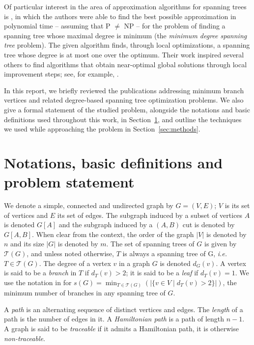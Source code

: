 \documentclass[12pt]{article}
\begin{document}
Of particular interest in the area of approximation algorithms for spanning trees is \cite{furer1992}, in which the authors were able to find the best possible approximation in polynomial time -- assuming that P $\neq$ NP -- for the problem of finding a spanning tree whose maximal degree is minimum (the \emph{minimum degree spanning tree} problem).
The given algorithm finds, through local optimizations, a spanning tree whose degree is at most one over the optimum. 
Their work inspired several others to find algorithms that obtain near-optimal global solutions through local improvement steps; see, for example, \cite{salamon2010, lu1996, chimani2015}.

In this report, we briefly reviewed the publications addressing minimum branch vertices and related degree-based spanning tree optimization problems.
We also give a formal statement of the studied problem, alongside the notations and basic definitions used throughout this work, in Section~\ref{sec:notations}, and outline the techniques we used while approaching the problem in Section~\ref{sec:methods}.

\section{Notations, basic definitions and problem statement} \label{sec:notations}

We denote a simple, connected and undirected graph by $G = (V, E)$; $V$ is its set of vertices and $E$ its set of edges.
The subgraph induced by a subset of vertices $A$ is denoted $G[A]$ and the subgraph induced by a $(A, B)$ cut is denoted by $G[A, B]$.
When clear from the context, the order of the graph $|V|$ is denoted by $n$ and its size $|G|$ is denoted by $m$.
The set of spanning trees of $G$ is given by $\mathcal{T}(G)$, and unless noted otherwise, $T$ is always a spanning tree of G, \emph{i.e.} $T \in \mathcal{T}(G)$.
The degree of a vertex $v$ in a graph $G$ is denoted $d_G(v)$.
A vertex is said to be a \emph{branch} in $T$ if $d_T(v) > 2$; it is said to be a \emph{leaf} if $d_T(v) = 1$.
We use the notation in \cite{gargano2004} for $s(G) = \min_{T \in \mathcal{T}(G)}(|\{v \in V \mid d_T(v) > 2 \}|)$, the minimum number of branches in any spanning tree of $G$.

A \emph{path} is an alternating sequence of distinct vertices and edges.
The \emph{length} of a path is the number of edges in it.
A \emph{Hamiltonian path} is a path of length $n - 1$.
A graph is said to be \emph{traceable} if it admits a Hamiltonian path, it is otherwise \emph{non-traceable}.
\end{document}
